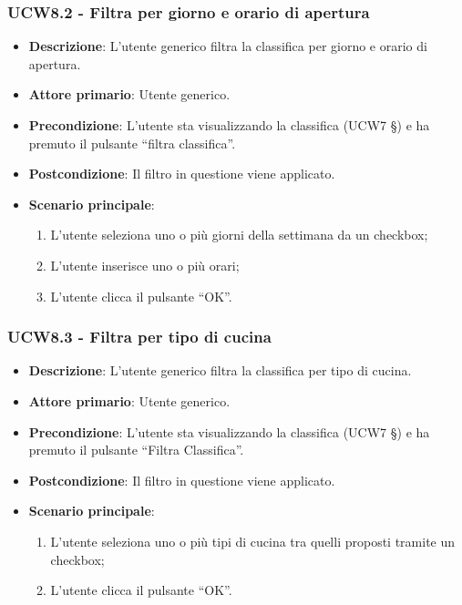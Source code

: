 \subsubsection{UCW8.2 - Filtra per giorno e orario di apertura}
\begin{itemize}
	\item \textbf{Descrizione}: L'utente generico filtra la classifica per giorno e orario di apertura.
    \item \textbf{Attore primario}: Utente generico.
    \item \textbf{Precondizione}: L’utente sta visualizzando la classifica (UCW7 §) e ha premuto il pulsante “filtra classifica”.
    \item \textbf{Postcondizione}: Il filtro in questione viene applicato.
    \item \textbf{Scenario principale}: 
    \begin{enumerate}
        \item L’utente seleziona uno o più giorni della settimana da un checkbox;
        \item L’utente inserisce uno o più orari;
        \item L’utente clicca il pulsante “OK”.
    \end{enumerate}
\end{itemize}

\subsubsection{UCW8.3 - Filtra per tipo di cucina}
\begin{itemize}
	\item \textbf{Descrizione}: L'utente generico filtra la classifica per tipo di cucina.
    \item \textbf{Attore primario}: Utente generico.
    \item \textbf{Precondizione}: L’utente sta visualizzando la classifica (UCW7 §) e ha premuto il pulsante “Filtra Classifica”.
    \item \textbf{Postcondizione}: Il filtro in questione viene applicato.
    \item \textbf{Scenario principale}: 
    \begin{enumerate}
        \item L’utente seleziona uno o più tipi di cucina tra quelli proposti tramite un checkbox;
        \item L’utente clicca il pulsante “OK”.
    \end{enumerate}
\end{itemize}

